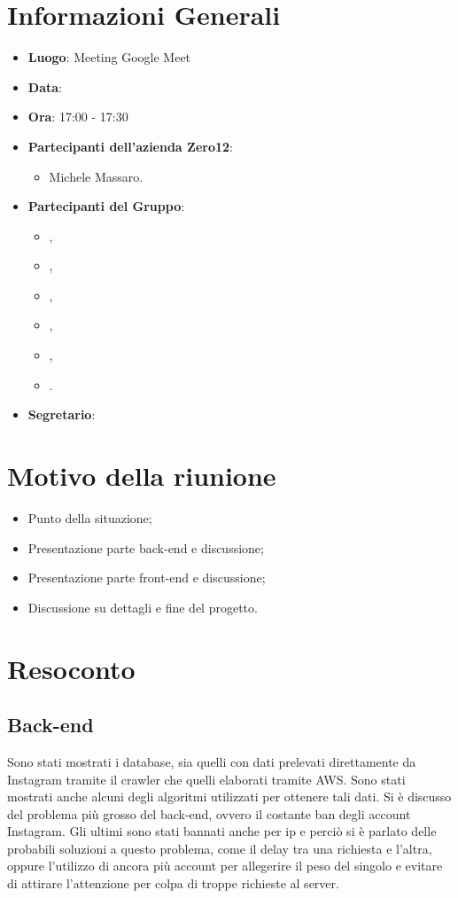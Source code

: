 \section{Informazioni Generali}

\begin{itemize}
\item{\textbf{Luogo}}: Meeting Google Meet
\item{\textbf{Data}}: \D{}
\item{\textbf{Ora}}: 17:00 - 17:30
\item{\textbf{Partecipanti dell'azienda Zero12}}: 
	\begin{itemize}
	\item{Michele Massaro.} 
	\end{itemize} 
\item{\textbf{Partecipanti del Gruppo}}: 
	\begin{itemize}
	\item{\EP{},} 
	\item{\FP{},}
	\item{\GC{},}
	\item{\LW{},}	
	\item{\MB{},}
	\item{\PV{}.}
	\end{itemize} 
\item{\textbf{Segretario}}: \GC{}
\end{itemize}

\section{Motivo della riunione}
\begin{itemize}
	\item{Punto della situazione;}
	\item {Presentazione parte back-end e discussione;}
	\item {Presentazione parte front-end e discussione;}
	\item {Discussione su dettagli e fine del progetto.}
\end{itemize}

\section{Resoconto}
\subsection{Back-end}
Sono stati mostrati i database, sia quelli con dati prelevati direttamente da Instagram tramite il crawler che quelli elaborati tramite AWS. Sono stati mostrati anche alcuni degli algoritmi utilizzati per ottenere tali dati.
Si è discusso del problema più grosso del back-end, ovvero il costante ban degli account Instagram. Gli ultimi sono stati bannati anche per ip e perciò si è parlato delle probabili soluzioni a questo problema, come il delay tra una richiesta e l'altra,
oppure l'utilizzo di ancora più account per allegerire il peso del singolo e evitare di attirare l'attenzione per colpa di troppe richieste al server. 


